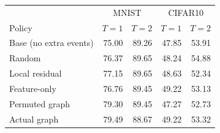 \begin{tabular}{lrrrr}
\toprule
 & \multicolumn{2}{c}{MNIST} & \multicolumn{2}{c}{CIFAR10} \\
Policy & $T=1$ & $T=2$ & $T=1$ & $T=2$ \\
\midrule
Base (no extra events) & 75.00 & 89.26 & 47.85 & 53.91 \\
Random & 76.37 & 89.65 & 48.24 & 54.88 \\
Local residual & 77.15 & 89.65 & 48.63 & 52.34 \\
Feature-only & 76.76 & 89.45 & 49.22 & 53.13 \\
Permuted graph & 79.30 & 89.45 & 47.27 & 52.73 \\
Actual graph & 79.49 & 88.67 & 49.22 & 53.32 \\
\bottomrule
\end{tabular}
